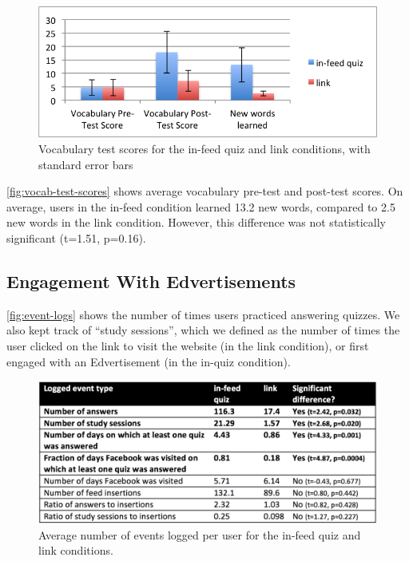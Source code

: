 \documentclass{sigchi}
\begin{document}
\begin{figure}
\centering
\includegraphics[width=1.0\columnwidth]{vocab-test-scores}
\caption{Vocabulary test scores for the in-feed quiz and link conditions, with standard error bars}
\label{fig:vocab-test-scores}
\end{figure}

\autoref{fig:vocab-test-scores} shows average vocabulary pre-test and post-test scores. On average, users in the in-feed condition learned 13.2 new words, compared to 2.5 new words in the link condition. However, this difference was not statistically significant (t=1.51, p=0.16).

\subsection{Engagement With Edvertisements}

\autoref{fig:event-logs} shows the number of times users practiced answering quizzes. We also kept track of ``study sessions'', which we defined as the number of times the user clicked on the link to visit the website (in the link condition), or first engaged with an Edvertisement (in the in-quiz condition). %

\begin{figure}
\centering
\includegraphics[width=1.0\columnwidth]{event-logs-feedlearn}
\caption{Average number of events logged per user for the in-feed quiz and link conditions.}
\label{fig:event-logs}
\end{figure}
\end{document}
